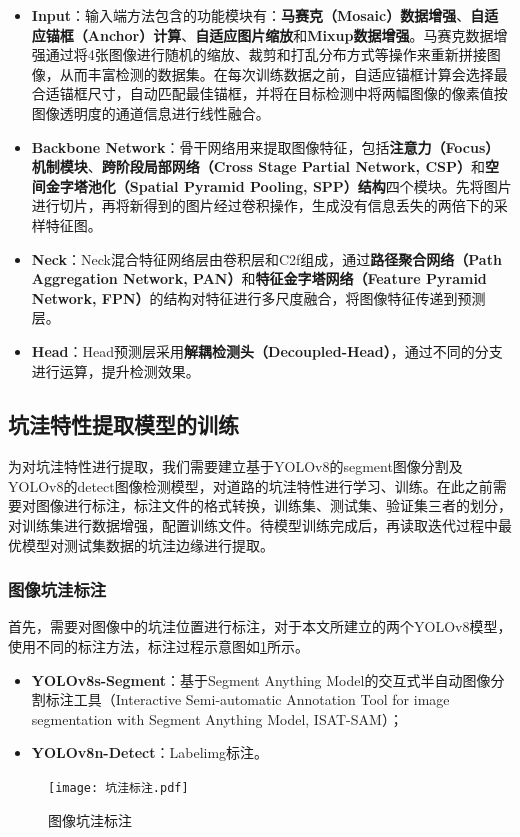 \documentclass{MathorCupmodeling}
\begin{document}
	\begin{itemize}
		\item \textbf{Input}：输入端方法包含的功能模块有：\textbf{马赛克（Mosaic）数据增强}、\textbf{自适应锚框（Anchor）计算}、\textbf{自适应图片缩放}和\textbf{Mixup数据增强}\textcolor{blue}{\cite{YOLO数据增强}}。马赛克数据增强通过将4张图像进行随机的缩放、裁剪和打乱分布方式等操作来重新拼接图像，从而丰富检测的数据集。在每次训练数据之前，自适应锚框计算会选择最合适锚框尺寸，自动匹配最佳锚框，并将在目标检测中将两幅图像的像素值按图像透明度的通道信息进行线性融合。
		\item \textbf{Backbone Network}：骨干网络用来提取图像特征，包括\textbf{注意力（Focus）机制模块}、\textbf{跨阶段局部网络（Cross Stage Partial Network, CSP）}和\textbf{空间金字塔池化（Spatial Pyramid Pooling, SPP）结构}四个模块。先将图片进行切片，再将新得到的图片经过卷积操作，生成没有信息丢失的两倍下的采样特征图。
		\item \textbf{Neck}：Neck混合特征网络层由卷积层和C2f组成，通过\textbf{路径聚合网络（Path Aggregation Network, PAN）}和\textbf{特征金字塔网络（Feature Pyramid Network, FPN）}的结构对特征进行多尺度融合，将图像特征传递到预测层。
		\item \textbf{Head}：Head预测层采用\textbf{解耦检测头（Decoupled-Head）}\textcolor{blue}{\cite{Head}}，通过不同的分支进行运算，提升检测效果。
	\end{itemize}

	\subsection{坑洼特性提取模型的训练}
	为对坑洼特性进行提取，我们需要建立基于YOLOv8的segment图像分割及YOLOv8的detect图像检测模型，对道路的坑洼特性进行学习、训练。在此之前需要对图像进行标注，标注文件的格式转换，训练集、测试集、验证集三者的划分，对训练集进行数据增强，配置训练文件。待模型训练完成后，再读取迭代过程中最优模型对测试集数据的坑洼边缘进行提取。
	\subsubsection{图像坑洼标注}
	首先，需要对图像中的坑洼位置进行标注，对于本文所建立的两个YOLOv8模型，使用不同的标注方法，标注过程示意图如\textcolor{blue}{\cref{fig:图像坑洼标注}}所示。
	\begin{itemize}
		\item \textbf{YOLOv8s-Segment}：基于Segment Anything Model的交互式半自动图像分割标注工具（Interactive Semi-automatic Annotation Tool for image segmentation with Segment Anything Model, ISAT-SAM）；
		\item \textbf{YOLOv8n-Detect}：Labelimg标注。
	\end{itemize}
	\begin{figure}[H]
		\centering
		\texttt{[image: 坑洼标注.pdf]}
		\caption{图像坑洼标注}
		\label{fig:图像坑洼标注}
	\end{figure}
\end{document}
